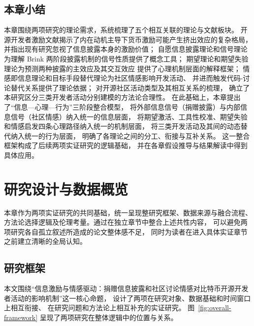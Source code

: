 \documentclass[
    type = master, %
    degree = professional,        %
    decl-page,  %
    twoside,                %
    fontset = fandol %
  ]{njuthesis}
\begin{document}
\section{本章小结}

本章围绕两项研究的理论需求，系统梳理了五个相互关联的理论与文献板块。
开源开发者激励文献揭示了内在动机主导下货币激励可能产生挤出效应的复杂格局，
并指出现有研究忽视了信息披露本身的激励价值；
自愿信息披露理论和信号理论为理解 Brink 两阶段披露机制的信号性质提供了概念工具；
期望理论和期望失验理论为预测两种披露的主效应及其交互效应
提供了心理机制层面的解释框架；
情感即信息理论和目标手段替代理论为社区情感影响开发活动、
并进而触发代码-讨论替代关系提供了理论依据；
对开源社区活动类型及其相互关系的梳理，
确立了本研究区分三类开发者活动分别建模的方法论合理性。
在此基础上，本章提出了``信息—心理—行为''三阶段整合模型，
将外部信息信号（捐赠披露）与内部信息信号（社区情感）纳入统一的信息层面，
将期望激活、工具性校准、期望失验和情感启发四条心理路径纳入统一的机制层面，
将三类开发活动及其间的动态替代纳入统一的行为层面，
明确了各理论之间的分工、衔接与互补关系。
这一整合框架构成了后续两项实证研究的逻辑基础，
并在各章假设推导与结果解读中得到具体应用。


\chapter{研究设计与数据概览}

本章作为两项实证研究的共同基础，统一呈现整研究框架、数据来源与融合流程、
方法论选择逻辑及伦理考量。通过在独立章节中整合上述共性内容，
可以避免两项研究各自孤立叙述所造成的论文整体感不足，
同时为读者在进入具体实证章节之前建立清晰的全局认知。

\section{研究框架}

本文围绕“信息激励与情感驱动：捐赠信息披露和社区讨论情感对比特币开源开发者活动的影响机制”这一核心命题，
设计了两项在研究对象、数据基础和时间窗口上相互衔接、
在研究问题和方法论上相互补充的实证研究。
图~\ref{fig:overall-framework} 呈现了两项研究在整体逻辑中的位置与关系。
\end{document}
